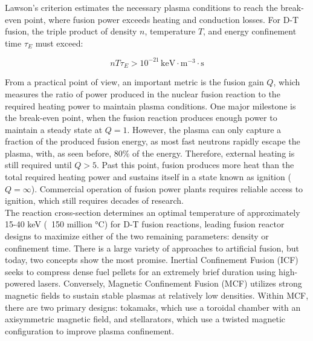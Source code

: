 Lawson's criterion \cite{Lawson1957} estimates the necessary plasma conditions to reach the break-even point, where fusion power exceeds heating and conduction losses. For D-T fusion, the triple product of density $n$, temperature $T$, and energy confinement time $\tau_E$ must exceed:

\begin{equation}
	\label{eq:LawsonCriterionDT}
	nT\tau_E > 10^{-21} \, \text{keV} \cdot \text{m}^{-3} \cdot \text{s}
\end{equation}

From a practical point of view, an important metric is the fusion gain $Q$, which measures the ratio of power produced in the nuclear fusion reaction to the required heating power to maintain plasma conditions. One major milestone is the break-even point, when the fusion reaction produces enough power to maintain a steady state at $Q=1$. However, the plasma can only capture a fraction of the produced fusion energy, as most fast neutrons rapidly escape the plasma, with, as seen before, 80\% of the energy. Therefore, external heating is still required until $Q>5$. Past this point, fusion produces more heat than the total required heating power and sustains itself in a state known as ignition ($Q=\infty$). Commercial operation of fusion power plants requires reliable access to ignition, which still requires decades of research. \\

The reaction cross-section determines an optimal temperature of approximately 15-40 keV (~150 million °C) for D-T fusion reactions, leading fusion reactor designs to maximize either of the two remaining parameters: density or confinement time. There is a large variety of approaches to artificial fusion, but today, two concepts show the most promise. Inertial Confinement Fusion (ICF) seeks to compress dense fuel pellets for an extremely brief duration using high-powered lasers. Conversely, Magnetic Confinement Fusion (MCF) utilizes strong magnetic fields to sustain stable plasmas at relatively low densities. Within MCF, there are two primary designs: tokamaks, which use a toroidal chamber with an axisymmetric magnetic field, and stellarators, which use a twisted magnetic configuration to improve plasma confinement.\\


